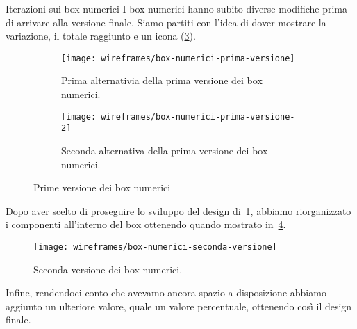 \documentclass[../../../main.tex]{subfiles}
\begin{document}
\begin{bclogo}{Iterazioni sui box numerici}
    I box numerici hanno subito diverse modifiche prima di arrivare alla versione finale. Siamo partiti con l'idea di dover mostrare la variazione, il totale raggiunto e un icona (\ref{fig:box-numerici-prima-versione}).
\begin{figure}[H]
    \begin{subfigure}[b]{0.5\textwidth}
        \centering
        \texttt{[image: wireframes/box-numerici-prima-versione]}
        \caption{Prima alternativia della prima versione dei box numerici.}
        \label{fig:box-numerici-prima-versione1}
    \end{subfigure}
    \begin{subfigure}[b]{0.5\textwidth}
        \centering
        \texttt{[image: wireframes/box-numerici-prima-versione-2]}
        \caption{Seconda alternativa della prima versione dei box numerici.}
        \label{fig:box-numerici-prima-versione2}
    \end{subfigure}
    \caption{Prime versione dei box numerici}
    \label{fig:box-numerici-prima-versione}
\end{figure}

Dopo aver scelto di proseguire lo sviluppo del design di~\ref{fig:box-numerici-prima-versione1}, abbiamo riorganizzato i componenti all'interno del box ottenendo quando mostrato in~\ref{fig:box-numerici-seconda-versione}.

\begin{figure}[H]
    \centering
    \texttt{[image: wireframes/box-numerici-seconda-versione]}
    \caption{Seconda versione dei box numerici.}
    \label{fig:box-numerici-seconda-versione}
\end{figure}

Infine, rendendoci conto che avevamo ancora spazio a disposizione abbiamo aggiunto un ulteriore valore, quale un valore percentuale, ottenendo così il design finale.
\end{bclogo}
\clearpage
\end{document}
